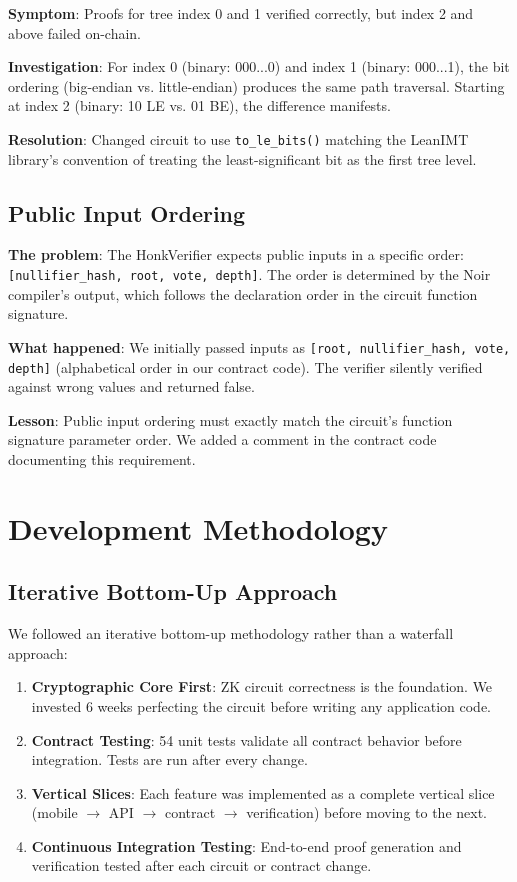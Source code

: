 \textbf{Symptom}: Proofs for tree index 0 and 1 verified correctly, but index 2 and above failed on-chain.

\textbf{Investigation}: For index 0 (binary: 000...0) and index 1 (binary: 000...1), the bit ordering (big-endian vs. little-endian) produces the same path traversal. Starting at index 2 (binary: 10 LE vs. 01 BE), the difference manifests.

\textbf{Resolution}: Changed circuit to use \texttt{to\_le\_bits()} matching the LeanIMT library's convention of treating the least-significant bit as the first tree level.

\subsection{Public Input Ordering}

\textbf{The problem}: The HonkVerifier expects public inputs in a specific order: \texttt{[nullifier\_hash, root, vote, depth]}. The order is determined by the Noir compiler's output, which follows the declaration order in the circuit function signature.

\textbf{What happened}: We initially passed inputs as \texttt{[root, nullifier\_hash, vote, depth]} (alphabetical order in our contract code). The verifier silently verified against wrong values and returned false.

\textbf{Lesson}: Public input ordering must exactly match the circuit's function signature parameter order. We added a comment in the contract code documenting this requirement.

\section{Development Methodology}

\subsection{Iterative Bottom-Up Approach}

We followed an iterative bottom-up methodology rather than a waterfall approach:

\begin{enumerate}
    \item \textbf{Cryptographic Core First}: ZK circuit correctness is the foundation. We invested 6 weeks perfecting the circuit before writing any application code.
    \item \textbf{Contract Testing}: 54 unit tests validate all contract behavior before integration. Tests are run after every change.
    \item \textbf{Vertical Slices}: Each feature was implemented as a complete vertical slice (mobile $\to$ API $\to$ contract $\to$ verification) before moving to the next.
    \item \textbf{Continuous Integration Testing}: End-to-end proof generation and verification tested after each circuit or contract change.
\end{enumerate}

